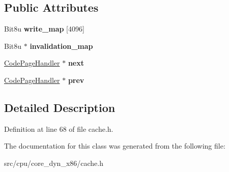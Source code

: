 \subsection*{Public Attributes}
\begin{DoxyCompactItemize}
\item 
\hypertarget{classCodePageHandler_a84538118ba7438d515bac485646702ce}{Bit8u {\bfseries write\-\_\-map} \mbox{[}4096\mbox{]}}\label{classCodePageHandler_a84538118ba7438d515bac485646702ce}

\item 
\hypertarget{classCodePageHandler_af014007ebce9214b94d6dabde94fc195}{Bit8u $\ast$ {\bfseries invalidation\-\_\-map}}\label{classCodePageHandler_af014007ebce9214b94d6dabde94fc195}

\item 
\hypertarget{classCodePageHandler_a967eb97a32a4281ba8e6cbf4b484c009}{\hyperlink{classCodePageHandler}{Code\-Page\-Handler} $\ast$ {\bfseries next}}\label{classCodePageHandler_a967eb97a32a4281ba8e6cbf4b484c009}

\item 
\hypertarget{classCodePageHandler_afbb9fc7febc79ace42c439c7564b23c7}{\hyperlink{classCodePageHandler}{Code\-Page\-Handler} $\ast$ {\bfseries prev}}\label{classCodePageHandler_afbb9fc7febc79ace42c439c7564b23c7}

\end{DoxyCompactItemize}


\subsection{Detailed Description}


Definition at line 68 of file cache.\-h.



The documentation for this class was generated from the following file\-:\begin{DoxyCompactItemize}
\item 
src/cpu/core\-\_\-dyn\-\_\-x86/cache.\-h\end{DoxyCompactItemize}
